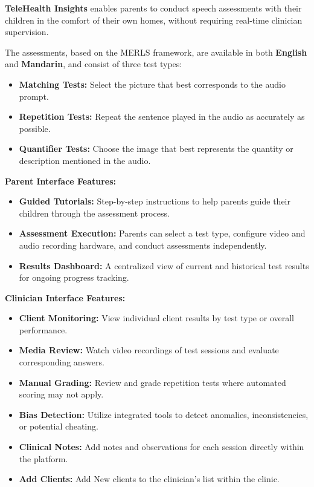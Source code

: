 \documentclass{article}
\begin{document}
\textbf{TeleHealth Insights} enables parents to conduct speech assessments with their children in the comfort of their own homes, without requiring real-time clinician supervision.

The assessments, based on the MERLS framework, are available in both \textbf{English} and \textbf{Mandarin}, and consist of three test types:
\begin{itemize}
    \item \textbf{Matching Tests:} Select the picture that best corresponds to the audio prompt.
    \item \textbf{Repetition Tests:} Repeat the sentence played in the audio as accurately as possible.
    \item \textbf{Quantifier Tests:} Choose the image that best represents the quantity or description mentioned in the audio.
\end{itemize}

\noindent\textbf{Parent Interface Features:}
\begin{itemize}
    \item \textbf{Guided Tutorials:} Step-by-step instructions to help parents guide their children through the assessment process.
    \item \textbf{Assessment Execution:} Parents can select a test type, configure video and audio recording hardware, and conduct assessments independently.
    \item \textbf{Results Dashboard:} A centralized view of current and historical test results for ongoing progress tracking.
\end{itemize}

\noindent\textbf{Clinician Interface Features:}
\begin{itemize}
    \item \textbf{Client Monitoring:} View individual client results by test type or overall performance.
    \item \textbf{Media Review:} Watch video recordings of test sessions and evaluate corresponding answers.
    \item \textbf{Manual Grading:} Review and grade repetition tests where automated scoring may not apply.
    \item \textbf{Bias Detection:} Utilize integrated tools to detect anomalies, inconsistencies, or potential cheating.
    \item \textbf{Clinical Notes:} Add notes and observations for each session directly within the platform.
    \item \textbf{Add Clients:} Add New clients to the clinician's list within the clinic.
\end{itemize}
\end{document}
